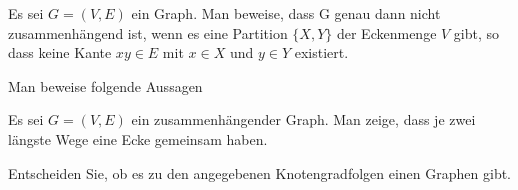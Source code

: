 \documentclass[10pt, a4paper]{exam}
\begin{document}
\begin{questions}
    \question Es sei $G=(V,E)$ ein Graph. Man beweise, dass G genau dann nicht zusammenhängend ist, wenn es eine Partition $\{X,Y\}$ der Eckenmenge $V$ gibt, so dass keine Kante $xy\in E$ mit $x\in X$ und $y\in Y$ existiert.
    \begin{solution}
    \end{solution}

    \question Man beweise folgende Aussagen

    \question Es sei $G=(V,E)$ ein zusammenhängender Graph. Man zeige, dass je zwei längste Wege eine Ecke gemeinsam haben.
    \begin{solution}
    \end{solution}

    \question Entscheiden Sie, ob es zu den angegebenen Knotengradfolgen einen Graphen gibt.
\end{questions}
\end{document}
